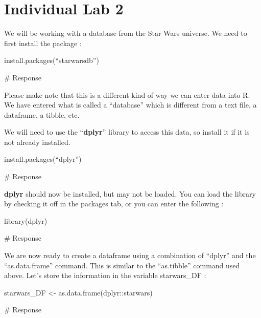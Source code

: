 \documentclass[
  letterpaper,
  DIV=11,
  numbers=noendperiod]{scrreprt}
\newenvironment{Shaded}{\begin{snugshade}}{\end{snugshade}}
\newcommand{\CommentTok}[1]{\textcolor[rgb]{0.37,0.37,0.37}{#1}}
\begin{document}
\chapter*{Individual Lab 2}\label{individual-lab-2}


We will be working with a database from the Star Wars universe. We need
to first install the package :

install.packages(``starwarsdb'')

\begin{Shaded}
\begin{Highlighting}[]
\CommentTok{\# Response}
\end{Highlighting}
\end{Shaded}

Please make note that this is a different kind of way we can enter data
into R. We have entered what is called a ``database'' which is different
from a text file, a dataframe, a tibble, etc.

We will need to use the ``\textbf{dplyr}'' library to access this data,
so install it if it is not already installed.

install.packages(``dplyr'')

\begin{Shaded}
\begin{Highlighting}[]
\CommentTok{\# Response}
\end{Highlighting}
\end{Shaded}

\textbf{dplyr} should now be installed, but may not be loaded. You can
load the library by checking it off in the packages tab, or you can
enter the following :

library(dplyr)

\begin{Shaded}
\begin{Highlighting}[]
\CommentTok{\# Response}
\end{Highlighting}
\end{Shaded}

We are now ready to create a dataframe using a combination of ``dplyr''
and the ``as.data.frame'' command. This is similar to the ``as.tibble''
command used above. Let's store the information in the variable
starwars\_DF :

starwars\_DF \textless- as.data.frame(dplyr::starwars)

\begin{Shaded}
\begin{Highlighting}[]
\CommentTok{\# Response}
\end{Highlighting}
\end{Shaded}
\end{document}
